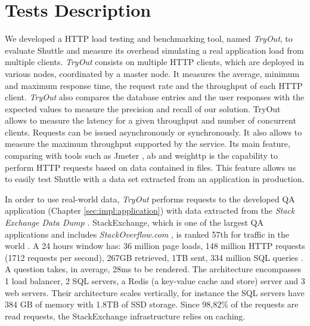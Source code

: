 \section{Tests Description}\label{sec:eval:test_description}

We developed a \ac{HTTP} load testing and benchmarking tool, named \emph{TryOut}, to evaluate Shuttle and measure its overhead simulating a real application load from multiple clients. \emph{TryOut} consists on multiple \ac{HTTP} clients, which are deployed in various nodes, coordinated by a master node. It measures the average, minimum and maximum response time, the request rate and the throughput of each \ac{HTTP} client. \emph{TryOut} also compares the database entries and the user responses with the expected values to measure the precision and recall of our solution. TryOut allows to measure the latency for a given throughput and number of concurrent clients. Requests can be issued asynchronously or synchronously. It also allows to measure the maximum throughput supported by the service. Its main feature, comparing with tools such as Jmeter \cite{jmeter}, ab \cite{ab} and weighttp \cite{Machado2012} is the capability to perform \ac{HTTP} requests based on data contained in files. This feature allows us to easily test Shuttle with a data set extracted from an application in production.

In order to use real-world data, \emph{TryOut} performs requests to the developed \acf{QA} application (Chapter \ref{sec:impl:application}) with data extracted from the \textit{Stack Exchange Data Dump} \cite{stackexchange_data}. StackExchange, which is one of the largest \ac{QA} applications and includes \textit{StackOverflow.com} \cite{stackoverflow}, is ranked 57th for traffic in the world \cite{websiteRanking}. A 24 hours window has: 36 million page loads, 148 million \ac{HTTP} requests (1712 requests per second), 267GB retrieved, 1TB sent, 334 million \ac{SQL} queries \cite{stackStatistics}. A question takes, in average, 28ms to be rendered. The architecture encompasses 1 load balancer, 2 \ac{SQL} servers, a Redis \cite{redis} (a key-value cache and store) server and 3 web servers. Their architecture scales vertically, for instance the \ac{SQL} servers have 384 GB of memory with 1.8TB of SSD storage. Since 98,82\% of the requests are read requests, the StackExchange infrastructure relies on caching.

